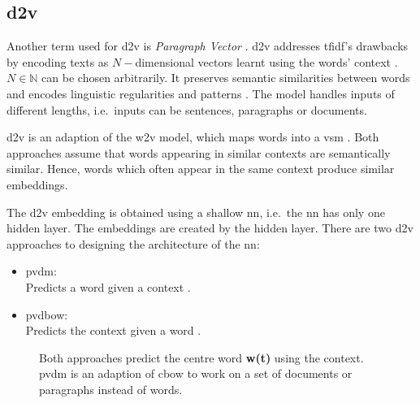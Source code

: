 \subsection{\acl*{d2v}}\label{subsec:doc2vec}

Another term used for \acf{d2v} is \textit{Paragraph Vector} \cite{clusteringDocs2020, SentRep2014}.
\ac{d2v} addresses \ac{tfidf}'s drawbacks by encoding texts as $N-$dimensional vectors learnt using the words' context \cite{clusteringDocs2020}.
$N \in \mathbb{N}$ can be chosen arbitrarily.
It preserves semantic similarities between words and encodes linguistic regularities and patterns \cite{SkipGram2013}.
The model handles inputs of different lengths, i.e.\ inputs can be sentences, paragraphs or documents.

\ac{d2v} is an adaption of the \ac{w2v} model, which maps words into a \ac{vsm} \cite{clusteringDocs2020}.
Both approaches assume that words appearing in similar contexts are semantically similar. 
Hence, words which often appear in the same context produce similar embeddings.

The \ac{d2v} embedding is obtained using a shallow \ac{nn}, i.e.\ the \ac{nn} has only one hidden layer.
The embeddings are created by the hidden layer.
There are two \ac{d2v} approaches to designing the architecture of the \ac{nn}:
\begin{itemize}
    \item \ac{pvdm}: \hfill\\ 
        Predicts a word given a context \cite{SentRep2014, WordRep2013}.
    \item \ac{pvdbow}: \hfill\\ 
        Predicts the context given a word \cite{EmbDist2015, SkipGram2013, SentRep2014}.
\end{itemize}

\begin{figure}%
    \centering
    \qquad
    \caption[\acs*{cbow} and \acs*{pvdm} architecture]{Both approaches predict the centre word \textbf{w(t)} using the context.
    \acs*{pvdm} is an adaption of \acs*{cbow} to work on a set of documents or paragraphs instead of words.
    }%
    \label{fig:pvdm}%
\end{figure}
 

